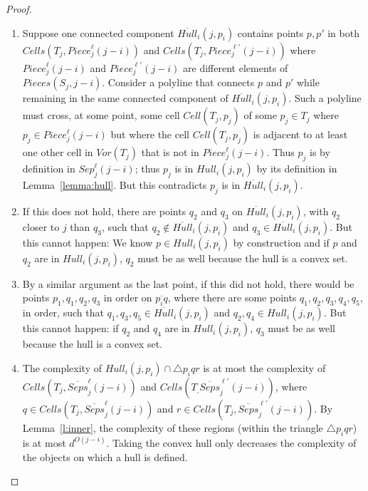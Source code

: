 \documentclass[12pt,a4paper,USenglish,cleveref, autoref, thm-restate]{article}
\newcommand{\Cell}{\mathit{Cell}}
\newcommand{\Cells}{\mathit{Cells}}
\newcommand{\Piece}{\mathit{Piece}}
\newcommand{\Sep}{\mathit{Sep}}
\newcommand{\Hull}{\mathit{Hull}}
\newcommand{\Voron}{\mathit{Vor}}
\newcommand{\Cell}{\mathit{Cell}}
\newcommand{\Cells}{\mathit{Cells}}
\newcommand{\Piece}{\mathit{Piece}}
\newcommand{\Sep}{\mathit{Sep}}
\newcommand{\Hull}{\mathit{Hull}}
\newcommand{\Voron}{\mathit{Vor}}
\newcommand{\Cell}{\mathit{Cell}}
\newcommand{\Cells}{\mathit{Cells}}
\newcommand{\Piece}{\mathit{Piece}}
\newcommand{\Sep}{\mathit{Sep}}
\newcommand{\Hull}{\mathit{Hull}}
\newcommand{\Voron}{\mathit{Vor}}
\begin{document}
\begin{proof}
    \begin{enumerate}
        \item \label{p1} Suppose one connected component $\overline{\Hull}_i(j,p_i)$ contains points $p,p'$ in  both 
    $\Cells(T_j,\Piece^\ell_j(j-i))$ and $\Cells(T_j,\Piece^{\ell'}_j(j-i))$ where $\Piece^\ell_j(j-i)$ and $\Piece^{\ell'}_j(j-i)$ are 
        different elements of $Pieces(S_j,j-i)$. Consider a polyline that connects $p$ and $p'$ while remaining in the same connected component of $\overline{\Hull}_i(j,p_i)$. Such a polyline must cross, at some point, some cell $\Cell(T_j,p_j)$ of some $p_j \in T_j$ where $p_j \in \Piece^\ell_j(j-i)$ but 
        where the cell $\Cell(T_j,p_j)$ is adjacent to at least one other cell in $\Voron(T_j)$ that is not in $\Piece^\ell_j(j-i)$.
        Thus $p_j$ is  by definition in $\Sep_j^\ell(j-i)$; thus $p_j$ is in $\Hull_i(j,p_i)$ by its definition in Lemma~\ref{lemma:hull}. But this contradicts $p_j$ is in  $\overline{\Hull}_i(j,p_i)$.
        \item \label{p2} 
        If this does not hold, there are points $q_2$ and $q_3$ on $\overline{\Hull}_i(j,p_i)$, with $q_2$ closer to $j$ than $q_3$, such that $q_2\not\in \overline{\Hull}_i(j,p_i)$ and $q_3 \in \overline{\Hull}_i(j,p_i)$.
         But this cannot happen: We know $p\in Hull_i(j,p_i)$ by construction and if $p$ and $q_2$ are in $Hull_i(j,p_i)$, $q_2$ must be as well because the hull is a convex set.
        \item \label{p3} 
        By a similar argument as the last point, if this did not hold, there would be points $p_1,q_1,q_2,q_3$ in order on $\overline{p_iq}$, where there are some points $q_1,q_2,q_3,q_4,q_5$, in order, such that $q_1,q_3,q_5\in \overline{\Hull}_i(j,p_i)$ and $q_2,q_4 \in \Hull_i(j,p_i)$. But this cannot happen: if $q_2$ and $q_4$ are in $\Hull_i(j,p_i)$, $q_3$ must be as well because the hull is a convex set.
        \item \label{p4} 
        The complexity of $\Hull_i(j,p_i) \cap \triangle p_iqr$ is at most the complexity
        of $\Cells(T_j,\overline{Seps}_j^\ell(j-i))$
        and $\Cells(T_,\overline{Seps}_j^{\ell'}(j-i))$, where 
        $q \in \Cells(T_j,\overline{Seps}_j^{\ell}(j-i))$ 
        and
        $r \in \Cells(T_j,\overline{Seps}_j^{\ell'}(j-i))$. 
        By Lemma~\ref{l:inner}, the complexity  of these regions (within the triangle $\triangle p_iqr$) is   at most $d^{O(j-i)}$. Taking the convex hull only decreases the complexity of the objects on which a hull is defined.
        
    \end{enumerate}
\end{proof}
\end{document}

